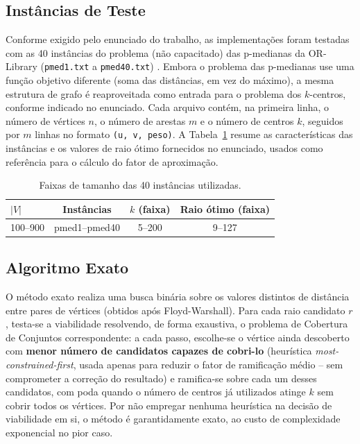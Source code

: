 \documentclass[10pt,twocolumn]{article}
\begin{document}
\subsection{Inst\^ancias de Teste}

Conforme exigido pelo enunciado do trabalho, as implementa\c{c}\~oes foram testadas com
as 40 inst\^ancias do problema (n\~ao capacitado) das p-medianas da OR-Library
(\texttt{pmed1.txt} a \texttt{pmed40.txt}) \cite{beasley1990}. Embora o problema das
p-medianas use uma fun\c{c}\~ao objetivo diferente (soma das dist\^ancias, em vez do
m\'aximo), a mesma estrutura de grafo \'e reaproveitada como entrada para o problema dos
$k$-centros, conforme indicado no enunciado. Cada arquivo cont\'em, na primeira linha, o
n\'umero de v\'ertices $n$, o n\'umero de arestas $m$ e o n\'umero de centros $k$,
seguidos por $m$ linhas no formato \texttt{(u, v, peso)}. A Tabela~\ref{tab:instancias}
resume as caracter\'isticas das inst\^ancias e os valores de raio \'otimo fornecidos no
enunciado, usados como refer\^encia para o c\'alculo do fator de aproxima\c{c}\~ao.

\begin{table}[t]
\centering
\caption{Faixas de tamanho das 40 inst\^ancias utilizadas.}
\label{tab:instancias}
\small
\begin{tabular}{lccc}
\toprule
$|V|$ & Inst\^ancias & $k$ (faixa) & Raio \'otimo (faixa) \\
\midrule
100--900 & pmed1--pmed40 & 5--200 & 9--127 \\
\bottomrule
\end{tabular}
\end{table}

\subsection{Algoritmo Exato}

O m\'etodo exato realiza uma busca bin\'aria sobre os valores distintos de dist\^ancia
entre pares de v\'ertices (obtidos ap\'os Floyd-Warshall). Para cada raio candidato $r$,
testa-se a viabilidade resolvendo, de forma exaustiva, o problema de Cobertura de
Conjuntos correspondente: a cada passo, escolhe-se o v\'ertice ainda descoberto com
\textbf{menor n\'umero de candidatos capazes de cobri-lo} (heur\'istica
\emph{most-constrained-first}, usada apenas para reduzir o fator de ramifica\c{c}\~ao
m\'edio -- sem comprometer a corre\c{c}\~ao do resultado) e ramifica-se sobre cada um
desses candidatos, com poda quando o n\'umero de centros j\'a utilizados atinge $k$ sem
cobrir todos os v\'ertices. Por n\~ao empregar nenhuma heur\'istica na decis\~ao de
viabilidade em si, o m\'etodo \'e garantidamente exato, ao custo de complexidade
exponencial no pior caso.
\end{document}
